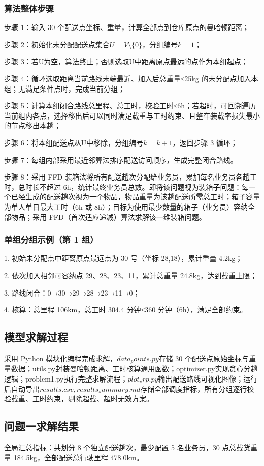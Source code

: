 \documentclass[withoutpreface,bwprint]{cumcmthesis} %
\begin{document}
\subsubsection{算法整体步骤}
步骤 1：输入 30 个配送点坐标、重量，计算全部点到仓库原点的曼哈顿距离；
\par 步骤 2：初始化未分配配送点集合\(U=V \setminus \{0\}\)，分组编号\(k=1\)；
\par 步骤 3：若U为空，算法终止；否则选取U中距离原点最远的点作为本组起点；
\par 步骤 4：循环选取距离当前路线末端最近、加入后总重量≤25kg 的未分配点加入本组；无满足条件点时，完成当前分组；
\par 步骤 5：计算本组闭合路线总里程、总工时，校验工时≤6h；若超时，可回溯遍历当前组内各点，选择移出后可以同时满足载重与工时约束、且整车装载率损失最小的节点移出本趟；
\par 步骤 6：将本组配送点从U中移除，分组编号\(k=k+1\)，返回步骤 3 循环；
\par 步骤 7：每组内部采用最近邻算法排序配送访问顺序，生成完整闭合路线。
\par 步骤 8：采用 FFD 装箱法将所有配送趟次分配给业务员，累加每名业务员各趟工时，总时长不超过 6h，统计最终业务员总数。即将该问题视为装箱子问题：每一个已经生成的配送趟次视为一个物品，物品重量为该趟配送所需总工时；箱子容量为单人单日最大工时（6h 或 8h）；目标为使用最少数量的箱子（业务员）容纳全部物品；采用 FFD（首次适应递减）算法求解该一维装箱问题。

\subsubsection{单组分组示例（第 1 组）}
1.	初始未分配点中距离原点最远点为 30 号（坐标 28,18），累计重量 4.2kg；
\par2.	依次加入相邻可容纳点 29、28、23、11，累计总重量 24.8kg，达到载重上限；
\par3.	路线闭合：0→30→29→28→23→11→0；
\par4.	核算：总里程 106km，总工时 304.4 分钟≤360 分钟（6h），满足全部约束。

\subsection{模型求解过程}
采用 Python 模块化编程完成求解，\(data_points.py\)存储 30 个配送点原始坐标与重量数据；utils.py封装曼哈顿距离、工时核算通用函数；optimizer.py实现贪心分趟逻辑；problem1.py执行完整求解流程；\(plot_vrp.py\)输出配送路线可视化图像；运行后自动导出\(results.csv,results_summary.md\)存储全部调度指标，所有分组逐行校验载重、工时约束，剔除超载、超时无效方案。

\subsection{问题一求解结果}
全局汇总指标：共划分 8 个独立配送趟次，最少配置 5 名业务员，30 点总载货重量 184.5kg，全部配送总行驶里程 478.0km。
\end{document}

